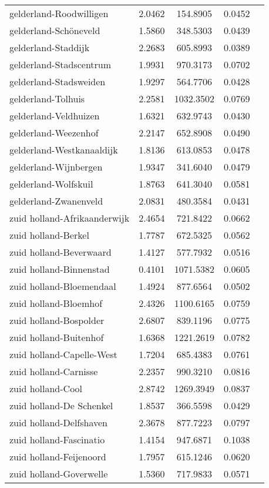 \begin{longtable}{llccc}
gelderland-Roodwilligen & 2.0462 & 154.8905 & 0.0452 \\
gelderland-Schöneveld & 1.5860 & 348.5303 & 0.0439 \\
gelderland-Staddijk & 2.2683 & 605.8993 & 0.0389 \\
gelderland-Stadscentrum & 1.9931 & 970.3173 & 0.0702 \\
gelderland-Stadsweiden & 1.9297 & 564.7706 & 0.0428 \\
gelderland-Tolhuis & 2.2581 & 1032.3502 & 0.0769 \\
gelderland-Veldhuizen & 1.6321 & 632.9743 & 0.0430 \\
gelderland-Weezenhof & 2.2147 & 652.8908 & 0.0490 \\
gelderland-Westkanaaldijk & 1.8136 & 613.0853 & 0.0478 \\
gelderland-Wijnbergen & 1.9347 & 341.6040 & 0.0479 \\
gelderland-Wolfskuil & 1.8763 & 641.3040 & 0.0581 \\
gelderland-Zwanenveld & 2.0831 & 480.3584 & 0.0431 \\
zuid holland-Afrikaanderwijk & 2.4654 & 721.8422 & 0.0662 \\
zuid holland-Berkel & 1.7787 & 672.5325 & 0.0562 \\
zuid holland-Beverwaard & 1.4127 & 577.7932 & 0.0516 \\
zuid holland-Binnenstad & 0.4101 & 1071.5382 & 0.0605 \\
zuid holland-Bloemendaal & 1.4924 & 877.6564 & 0.0502 \\
zuid holland-Bloemhof & 2.4326 & 1100.6165 & 0.0759 \\
zuid holland-Bospolder & 2.6807 & 839.1196 & 0.0775 \\
zuid holland-Buitenhof & 1.6368 & 1221.2619 & 0.0782 \\
zuid holland-Capelle-West & 1.7204 & 685.4383 & 0.0761 \\
zuid holland-Carnisse & 2.2357 & 990.3210 & 0.0816 \\
zuid holland-Cool & 2.8742 & 1269.3949 & 0.0837 \\
zuid holland-De Schenkel & 1.8537 & 366.5598 & 0.0429 \\
zuid holland-Delfshaven & 2.3678 & 877.7223 & 0.0797 \\
zuid holland-Fascinatio & 1.4154 & 947.6871 & 0.1038 \\
zuid holland-Feijenoord & 1.7957 & 615.1246 & 0.0620 \\
zuid holland-Goverwelle & 1.5360 & 717.9833 & 0.0571 \\

\end{longtable}

